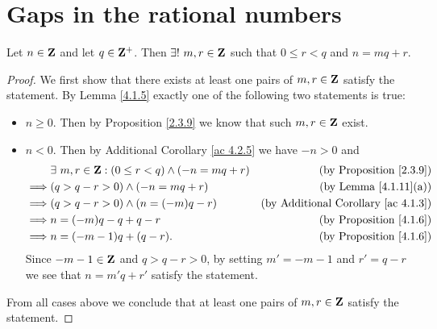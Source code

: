 \section{Gaps in the rational numbers}\label{sec 4.4}

\begin{additional corollary}\label{ac 4.4.1}
Let \(n \in \mathbf{Z}\) and let \(q \in \mathbf{Z}^+\).
Then \(\exists!\ m, r \in \mathbf{Z}\) such that \(0 \leq r < q\) and \(n = mq + r\).
\end{additional corollary}

\begin{proof}
    We first show that there exists at least one pairs of \(m, r \in \mathbf{Z}\) satisfy the statement.
    By Lemma \ref{4.1.5} exactly one of the following two statements is true:
    \begin{itemize}
        \item \(n \geq 0\).
              Then by Proposition \ref{2.3.9} we know that such \(m, r \in \mathbf{Z}\) exist.
        \item \(n < 0\).
              Then by Additional Corollary \ref{ac 4.2.5} we have \(-n > 0\) and
              \begin{align*}
                           & \exists\ m, r \in \mathbf{Z} : (0 \leq r < q) \land (-n = mq + r) & \text{(by Proposition \ref{2.3.9})}             \\
                  \implies & (q > q - r > 0) \land (-n = mq + r)                       & \text{(by Lemma \ref{4.1.11}(a))}               \\
                  \implies & (q > q - r > 0) \land (n = (-m)q - r)                     & \text{(by Additional Corollary \ref{ac 4.1.3})} \\
                  \implies & n = (-m)q - q + q - r                                     & \text{(by Proposition \ref{4.1.6})}             \\
                  \implies & n = (-m - 1)q + (q - r).                                  & \text{(by Proposition \ref{4.1.6})}
              \end{align*}
              Since \(-m - 1 \in \mathbf{Z}\) and \(q > q - r > 0\), by setting \(m' = -m - 1\) and \(r' = q - r\) we see that \(n = m'q + r'\) satisfy the statement.
    \end{itemize}
    From all cases above we conclude that at least one pairs of \(m, r \in \mathbf{Z}\) satisfy the statement.


\end{proof}
